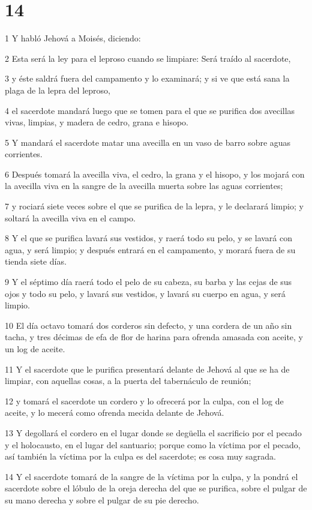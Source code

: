 \chapter{14}

\par 1 Y habló Jehová a Moisés, diciendo:
\par 2 Esta será la ley para el leproso cuando se limpiare: Será traído al sacerdote,
\par 3 y éste saldrá fuera del campamento y lo examinará; y si ve que está sana la plaga de la lepra del leproso,
\par 4 el sacerdote mandará luego que se tomen para el que se purifica dos avecillas vivas, limpias, y madera de cedro, grana e hisopo.
\par 5 Y mandará el sacerdote matar una avecilla en un vaso de barro sobre aguas corrientes.
\par 6 Después tomará la avecilla viva, el cedro, la grana y el hisopo, y los mojará con la avecilla viva en la sangre de la avecilla muerta sobre las aguas corrientes;
\par 7 y rociará siete veces sobre el que se purifica de la lepra, y le declarará limpio; y soltará la avecilla viva en el campo.
\par 8 Y el que se purifica lavará sus vestidos, y raerá todo su pelo, y se lavará con agua, y será limpio; y después entrará en el campamento, y morará fuera de su tienda siete días.
\par 9 Y el séptimo día raerá todo el pelo de su cabeza, su barba y las cejas de sus ojos y todo su pelo, y lavará sus vestidos, y lavará su cuerpo en agua, y será limpio.
\par 10 El día octavo tomará dos corderos sin defecto, y una cordera de un año sin tacha, y tres décimas de efa   de flor de harina para ofrenda amasada con aceite, y un log de aceite.
\par 11 Y el sacerdote que le purifica presentará delante de Jehová al que se ha de limpiar, con aquellas cosas, a la puerta del tabernáculo de reunión;
\par 12 y tomará el sacerdote un cordero y lo ofrecerá por la culpa, con el log   de aceite, y lo mecerá como ofrenda mecida delante de Jehová.
\par 13 Y degollará el cordero en el lugar donde se degüella el sacrificio por el pecado y el holocausto, en el lugar del santuario; porque como la víctima por el pecado, así también la víctima por la culpa es del sacerdote; es cosa muy sagrada.
\par 14 Y el sacerdote tomará de la sangre de la víctima por la culpa, y la pondrá el sacerdote sobre el lóbulo de la oreja derecha del que se purifica, sobre el pulgar de su mano derecha y sobre el pulgar de su pie derecho.
